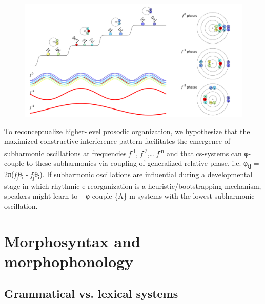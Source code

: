  
\begin{figure}
\includegraphics[width=\textwidth]{figures/Tilsen-img64.png}
\caption{\missingcaption}
\label{fig:4:14}
\end{figure}
 

  To reconceptualize higher-level prosodic organization, we hypothesize that the maximized constructive interference pattern facilitates the emergence of subharmonic oscillations at frequencies \textit{f}\textsuperscript{{}-1}, \textit{f}\textsuperscript{{}-2},… \textit{f}\textsuperscript{{}-n} and that cs-systems can φ-couple to these subharmonics via coupling of generalized relative phase, i.e. φ\textsubscript{ij} = 2π(\textit{f}\textsubscript{j}θ\textsubscript{i} - \textit{f}\textsubscript{j}θ\textsubscript{i}). If subharmonic oscillations are influential during a developmental stage in which rhythmic e-reorganization is a heuristic/bootstrapping mechanism, speakers might learn to +φ-couple \{A\} m-systems with the lowest subharmonic oscillation.

\section{Morphosyntax and morphophonology}
\rohead{\headmark}
\subsection{Grammatical vs. lexical systems}

